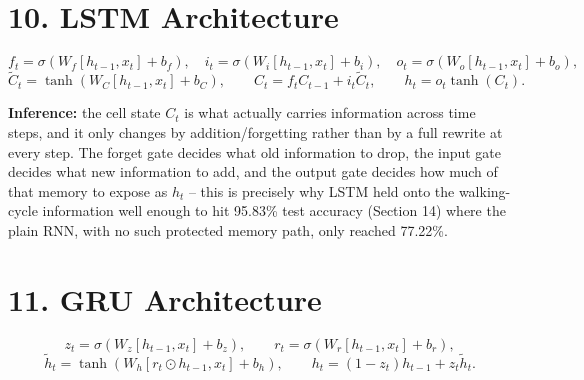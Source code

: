 \documentclass[10pt]{article}
\begin{document}
\section*{10. LSTM Architecture}

\[
f_t=\sigma(W_f[h_{t-1},x_t]+b_f),\quad
i_t=\sigma(W_i[h_{t-1},x_t]+b_i),\quad
o_t=\sigma(W_o[h_{t-1},x_t]+b_o),
\]
\[
\tilde{C}_t=\tanh(W_C[h_{t-1},x_t]+b_C),\qquad
C_t=f_tC_{t-1}+i_t\tilde{C}_t,\qquad
h_t=o_t\tanh(C_t).
\]

\begin{center}
\end{center}

\textbf{Inference:} the cell state $C_t$ is what actually carries information
across time steps, and it only changes by addition/forgetting rather than by
a full rewrite at every step. The forget gate decides what old information to
drop, the input gate decides what new information to add, and the output
gate decides how much of that memory to expose as $h_t$ -- this is precisely
why LSTM held onto the walking-cycle information well enough to hit 95.83\%
test accuracy (Section 14) where the plain RNN, with no such protected
memory path, only reached 77.22\%.

\section*{11. GRU Architecture}

\[
z_t=\sigma(W_z[h_{t-1},x_t]+b_z),\qquad r_t=\sigma(W_r[h_{t-1},x_t]+b_r),
\]
\[
\tilde{h}_t=\tanh(W_h[r_t\odot h_{t-1},x_t]+b_h),\qquad
h_t=(1-z_t)h_{t-1}+z_t\tilde{h}_t.
\]

\begin{center}
\end{center}
\end{document}
